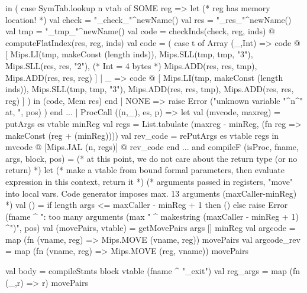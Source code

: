 \documentclass[10pt]{article}
\begin{document}
\begin{fancycode}[frame=lines,fontsize=\scriptsize,label=\textit{edited code - SRC/Compiler.sml}]
        in ( case SymTab.lookup n vtab of
            SOME reg => let
                (* reg has memory location! *)
                val check    = "_check_"^newName()
                val res      = "_res_"^newName()
                val tmp      = "_tmp_"^newName()
                val code = checkInds(check, reg, inds) @
                           computeFlatIndex(res, reg, inds)
            val code = ( case t of
                Array (_,Int) => code @
                    [ Mips.LI(tmp, makeConst (length inds)),
                      Mips.SLL(tmp, tmp, "3"),
                      Mips.SLL(res, res, "2"), (* Int = 4 bytes *)
                      Mips.ADD(res, res, tmp),
                      Mips.ADD(res, res, reg) ]
                | _ => code @
                    [ Mips.LI(tmp, makeConst (length inds)),
                      Mips.SLL(tmp, tmp, "3"),
                      Mips.ADD(res, res, tmp),
                      Mips.ADD(res, res, reg) ]
                )
            in
                (code, Mem res)
            end
          | NONE => raise Error ("unknown variable "^n^" at, ", pos) )
        end
...
        | ProcCall ((n,_), es, p) => 
          let
              val (mvcode, maxreg) = putArgs es vtable minReg
              val regs = List.tabulate (maxreg - minReg, (fn reg => makeConst (reg + (minReg))))
              val rev_code = rePutArgs es vtable regs
          in
              mvcode
              @ [Mips.JAL (n, regs)]
              @ rev_code
          end
...
  and compileF (isProc, fname, args, block, pos) =
      (* at this point, we do not care about the return type (or no return) *)
      let (* make a vtable from bound formal parameters,
               then evaluate expression in this context, return it *)
          (* arguments passed in registers, "move" into local vars.
             Code generator imposes max. 13 arguments (maxCaller-minReg)
           *)
          val () = if length args <= maxCaller - minReg + 1 then ()
                   else raise Error (fname ^ ": too many arguments (max "
                                     ^ makestring (maxCaller - minReg + 1)
                                     ^")", pos)
          val (movePairs, vtable) = getMovePairs args [] minReg
          val argcode = map (fn (vname, reg) => Mips.MOVE (vname, reg)) movePairs
          val argcode_rev = map (fn (vname, reg) => Mips.MOVE (reg, vname)) movePairs

          val body = compileStmts block vtable (fname ^ "_exit")
          val reg_args = map (fn (_,r) => r) movePairs


\end{fancycode}
\end{document}
